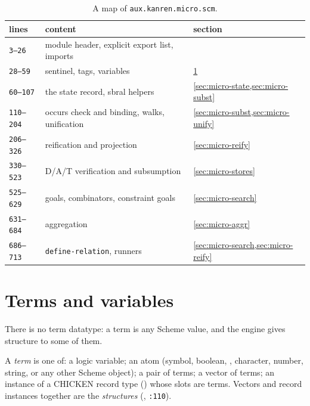 \begin{table}[h]
\centering\small
\caption{A map of \texttt{aux.kanren.micro.scm}.}\label{tab:micro-map}
\begin{tabular}{@{}lll@{}}
\toprule
lines & content & section \\
\midrule
\texttt{3–26}    & module header, explicit export list, imports & \\
\texttt{28–59}   & sentinel, tags, variables & \cref{sec:micro-terms} \\
\texttt{60–107}  & the state record, sbral helpers & \cref{sec:micro-state,sec:micro-subst} \\
\texttt{110–204} & occurs check and binding, walks, unification & \cref{sec:micro-subst,sec:micro-unify} \\
\texttt{206–326} & reification and projection & \cref{sec:micro-reify} \\
\texttt{330–523} & D/A/T verification and subsumption & \cref{sec:micro-stores} \\
\texttt{525–629} & goals, combinators, constraint goals & \cref{sec:micro-search} \\
\texttt{631–684} & aggregation & \cref{sec:micro-aggr} \\
\texttt{686–713} & \texttt{define-relation}, runners & \cref{sec:micro-search,sec:micro-reify} \\
\bottomrule
\end{tabular}
\end{table}

\section{Terms and variables}\label{sec:micro-terms}

There is no term datatype: a term is any Scheme value, and the engine gives structure to some of
them.

\begin{definition}\label{def:micro-term}
A \emph{term} is one of: a logic variable; an atom (symbol, boolean, , character, number,
string, or any other Scheme object); a pair  of terms; a vector of terms; an instance of a
CHICKEN record type () whose slots are terms. Vectors and record instances
together are the \emph{structures} (, \texttt{:110}).
\end{definition}

